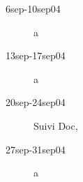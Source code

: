 \begin{description}
\item[6sep-10sep04]a

\item[13sep-17sep04]a

\item[20sep-24sep04]Suivi Doc,

\item[27sep-31sep04]a
\end{description}
